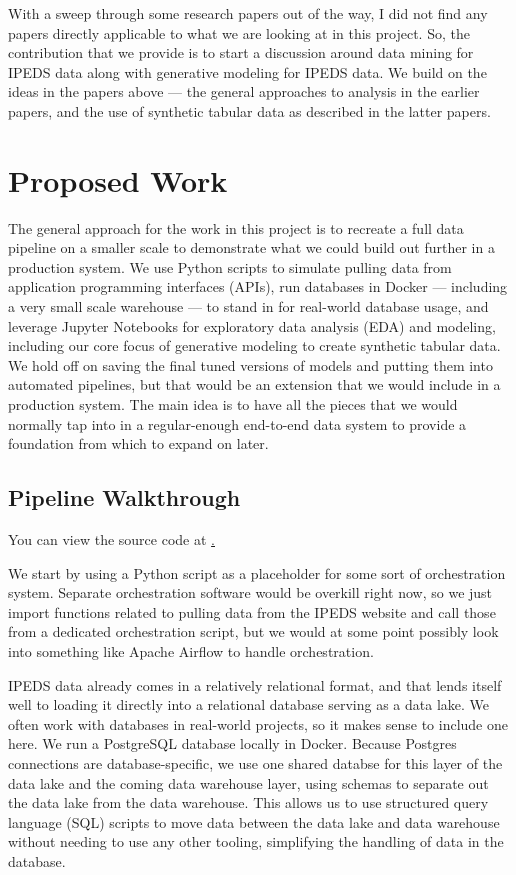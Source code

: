 \documentclass[sigconf, authorversion, nonacm]{acmart}
\begin{document}
    With a sweep through some research papers out of the way, I did not find any papers directly applicable to what we are looking at in this project. So, the contribution that we provide is to start a discussion around data mining for IPEDS data along with generative modeling for IPEDS data. We build on the ideas in the papers above --- the general approaches to analysis in the earlier papers, and the use of synthetic tabular data as described in the latter papers.

\section{Proposed Work}

    The general approach for the work in this project is to recreate a full data pipeline on a smaller scale to demonstrate what we could build out further in a production system. We use Python scripts to simulate pulling data from application programming interfaces (APIs), run databases in Docker --- including a very small scale warehouse --- to stand in for real-world database usage, and leverage Jupyter Notebooks for exploratory data analysis (EDA) and modeling, including our core focus of generative modeling to create synthetic tabular data. We hold off on saving the final tuned versions of models and putting them into automated pipelines, but that would be an extension that we would include in a production system. The main idea is to have all the pieces that we would normally tap into in a regular-enough end-to-end data system to provide a foundation from which to expand on later.

    \subsection{Pipeline Walkthrough}

    You can view the source code at \href{https://github.com/jhleakakos/msds-data-mining-project}.

    We start by using a Python script as a placeholder for some sort of orchestration system. Separate orchestration software would be overkill right now, so we just import functions related to pulling data from the IPEDS website and call those from a dedicated orchestration script, but we would at some point possibly look into something like Apache Airflow to handle orchestration.

    IPEDS data already comes in a relatively relational format, and that lends itself well to loading it directly into a relational database serving as a data lake. We often work with databases in real-world projects, so it makes sense to include one here. We run a PostgreSQL database locally in Docker. Because Postgres connections are database-specific, we use one shared databse for this layer of the data lake and the coming data warehouse layer, using schemas to separate out the data lake from the data warehouse. This allows us to use structured query language (SQL) scripts to move data between the data lake and data warehouse without needing to use any other tooling, simplifying the handling of data in the database.
\end{document}
